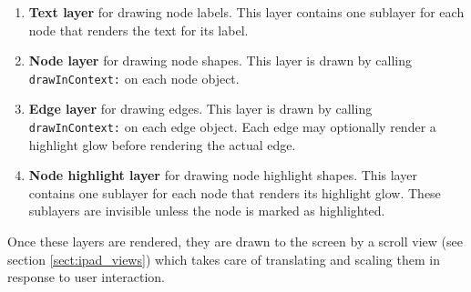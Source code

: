 \begin{enumerate}

    \item \textbf{Text layer} for drawing node labels. This layer contains
        one sublayer for each node that renders the text for its label.

    \item \textbf{Node layer} for drawing node shapes. This layer is drawn by
        calling \texttt{drawInContext:} on each node object.

    \item \textbf{Edge layer} for drawing edges. This layer is drawn by calling
        \texttt{drawInContext:} on each edge object. Each edge may optionally
        render a highlight glow before rendering the actual edge.

    \item \textbf{Node highlight layer} for drawing node highlight shapes. This
        layer contains one sublayer for each node that renders its highlight
        glow. These sublayers are invisible unless the node is marked as
        highlighted.

\end{enumerate}

Once these layers are rendered, they are drawn to the screen by a scroll view
(see section \ref{sect:ipad_views}) which takes care of translating and scaling
them in response to user interaction.
